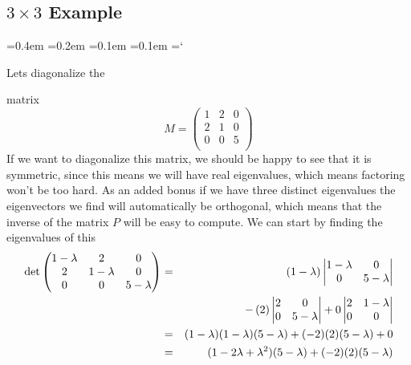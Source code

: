 
\subsection*{$3\times3$ Example}

{\ttfamily
{}\font=0.4em
\font=0.2em
\font=0.1em
\font=0.1em
\hyphenchar\font=`\-


\hypertarget{scripts_diagonalizing_symmetric_matrices_3by3_example}{Lets diagonalize the} matrix
\[
M = 
\begin{pmatrix}
1 &2 & 0 \\
2 & 1 & 0 \\
0& 0 & 5  \\
\end{pmatrix}
\] 
If we want to diagonalize this matrix, we should be happy to see that it is symmetric, since this means we will have real eigenvalues, which means factoring won't be too hard.  As an added bonus if we have three distinct eigenvalues the eigenvectors we find will automatically be orthogonal, which means that the inverse of the matrix $P$ will be easy to compute. We can start by finding the eigenvalues of this 
\begin{eqnarray*}
\det \begin{pmatrix}
1-\lambda &\mc2 & \mc0 \\
\mc2 & 1 -\lambda& \mc0 \\
\mc0& \mc0 & 5-\lambda  \\
\end{pmatrix}
 &=& (1-\lambda) 
\begin{vmatrix}
1 -\lambda&\mc 0 \\
\mc0 & 5-\lambda  \\
\end{vmatrix}
\\ & & - \, (2) 
 \begin{vmatrix}
2 & \mc0 \\
0& 5-\lambda  \\
\end{vmatrix}
 + 0 \begin{vmatrix}
2 & 1 -\lambda \\
0& \mc0   \\
\end{vmatrix}\\
&=&(1-\lambda)(1-\lambda)(5-\lambda)+ (-2)(2)(5-\lambda) +0\\
&=&(1-2\lambda +\lambda^2)(5-\lambda) + (-2)(2)(5-\lambda)\\

\end{eqnarray*}}
